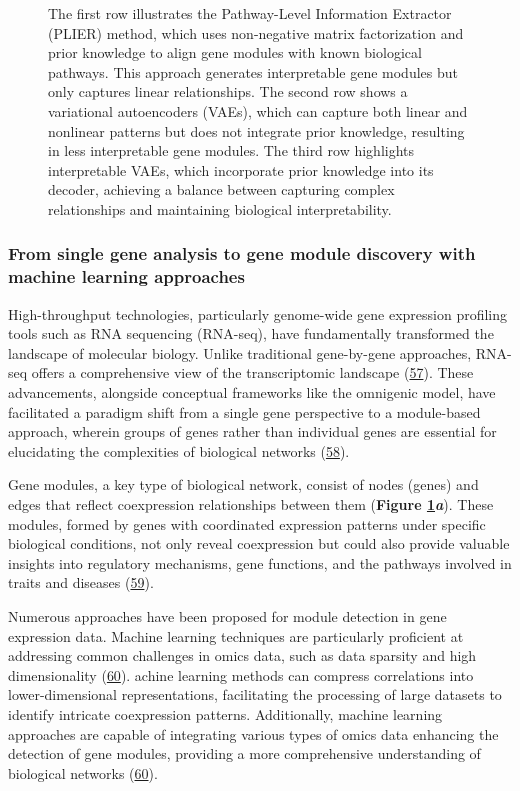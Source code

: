 \begin{figure}
{{The first row illustrates the Pathway-Level Information Extractor (PLIER) method, which uses non-negative matrix factorization and prior knowledge to align gene modules with known biological pathways.
This approach generates interpretable gene modules but only captures linear relationships.
The second row shows a variational autoencoders (VAEs), which can capture both linear and nonlinear patterns but does not integrate prior knowledge, resulting in less interpretable gene modules.
The third row highlights interpretable VAEs, which incorporate prior knowledge into its decoder, achieving a balance between capturing complex relationships and maintaining biological interpretability.}\label{fig:fig3}
}
\end{figure}

\hypertarget{from-single-gene-analysis-to-gene-module-discovery-with-machine-learning-approaches}{%
\subsubsection{From single gene analysis to gene module discovery with machine learning approaches}\label{from-single-gene-analysis-to-gene-module-discovery-with-machine-learning-approaches}}

High-throughput technologies, particularly genome-wide gene expression profiling tools such as RNA sequencing (RNA-seq), have fundamentally transformed the landscape of molecular biology.
Unlike traditional gene-by-gene approaches, RNA-seq offers a comprehensive view of the transcriptomic landscape (\protect\hyperlink{ref-Zm8nV5AC}{57}).
These advancements, alongside conceptual frameworks like the omnigenic model, have facilitated a paradigm shift from a single gene perspective to a module-based approach, wherein groups of genes rather than individual genes are essential for elucidating the complexities of biological networks (\protect\hyperlink{ref-SD886fuE}{58}).

Gene modules, a key type of biological network, consist of nodes (genes) and edges that reflect coexpression relationships between them (\textbf{Figure \ref{fig:fig3}\emph{a}}).
These modules, formed by genes with coordinated expression patterns under specific biological conditions, not only reveal coexpression but could also provide valuable insights into regulatory mechanisms, gene functions, and the pathways involved in traits and diseases (\protect\hyperlink{ref-QUI8V4RY}{59}).

Numerous approaches have been proposed for module detection in gene expression data.
Machine learning techniques are particularly proficient at addressing common challenges in omics data, such as data sparsity and high dimensionality (\protect\hyperlink{ref-K4KeL4gw}{60}).
achine learning methods can compress correlations into lower-dimensional representations, facilitating the processing of large datasets to identify intricate coexpression patterns.
Additionally, machine learning approaches are capable of integrating various types of omics data enhancing the detection of gene modules, providing a more comprehensive understanding of biological networks (\protect\hyperlink{ref-K4KeL4gw}{60}).

